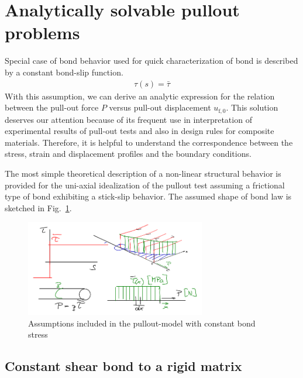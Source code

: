 \documentclass[main.tex]{subfiles}
\begin{document}
\section{Analytically solvable pullout problems}

\label{SEC:PullOutAnalytical}

Special case of bond behavior used for quick characterization of bond is described by a constant bond-slip function.
\begin{align}
\tau(s) = \bar{\tau}
\label{FIGCostantShear}
\end{align}
With this assumption, we can derive an analytic expression for the relation between the pull-out force $P$ versus pull-out displacement $u_{\mathrm{f,0}}$. This solution deserves our attention because of its frequent use in interpretation of experimental results of pull-out tests and also in design rules for composite materials. 
Therefore, it is helpful to understand the correspondence between the stress, strain and displacement profiles and   
the boundary conditions. 

The most simple theoretical description of a non-linear structural behavior is provided for the uni-axial idealization of the pullout test assuming a frictional type of bond exhibiting a stick-slip behavior. 
The assumed shape of bond law is sketched in Fig.~\ref{FIGConstantBondAssumptions}.
\begin{figure}[t]
	\centering
  \includegraphics[width=0.7\textwidth]{drawings/constant_bond_boundary_conditions.png}
	\caption{Assumptions included in the pullout-model with constant bond stress}
	\label{FIGConstantBondAssumptions}
\end{figure}

\subsection{Constant shear bond to a rigid matrix}

\label{SEC:ConstantBondRigidMatrix}
\end{document}

